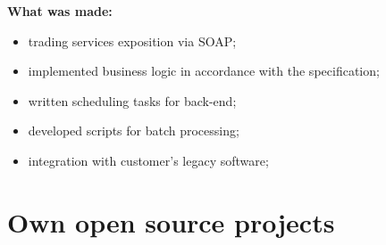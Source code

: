 \documentclass[a4paper, 12pt]{article}
\begin{document}
\begin{itemize}
               \textbf{What was made:}
			\begin{itemize}
				\item trading services exposition via SOAP;
  				\item implemented business logic in accordance with the specification;
  				\item written scheduling tasks for back-end; 
				\item developed scripts for batch processing;
				\item integration with customer's legacy software;
			\end{itemize}


    \end{itemize}    
    
\section*{Own open source projects}  
\end{document}
